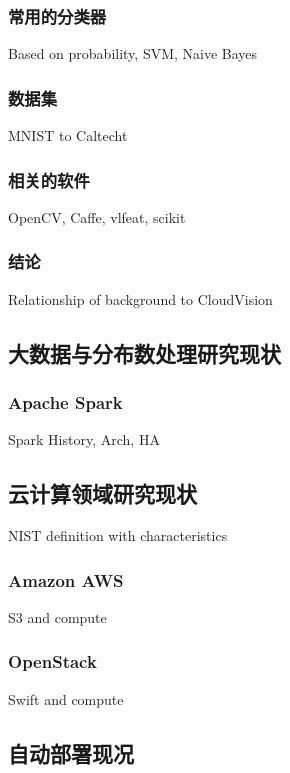 \subsubsection{常用的分类器}
\label{subsubsec:classifier}
Based on probability, SVM, Naive Bayes

\subsubsection{数据集}

MNIST to Caltecht

\subsubsection{相关的软件}
OpenCV, Caffe, vlfeat, scikit


\subsubsection{结论}
Relationship of background to CloudVision

\subsection{大数据与分布数处理研究现状}
\label{subsec:bigdata_background}

\subsubsection{Apache Spark}
\label{subsubsec:spark}
Spark History, Arch, HA

\subsection{云计算领域研究现状}
\label{subsec:cloud_background}
NIST definition with characteristics

\subsubsection{Amazon AWS}
S3 and compute

\subsubsection{OpenStack}
\label{subsubsec:openstack}
Swift and compute

\subsection{自动部署现况}
\label{subsec:automated_deployment}

